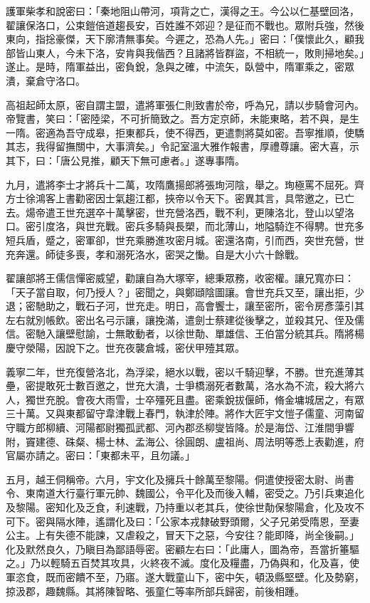 \begin{pinyinscope}
 護軍柴孝和說密曰：「秦地阻山帶河，項背之亡，漢得之王。今公以仁基壁回洛，翟讓保洛口，公束鎧倍道趨長安，百姓誰不郊迎？是征而不戰也。眾附兵強，然後東向，指捴豪傑，天下廓清無事矣。今遲之，恐為人先。」密曰：「僕懷此久，顧我部皆山東人，今未下洛，安肯與我偕西？且諸將皆群盜，不相統一，敗則掃地矣。」遂止。是時，隋軍益出，密負銳，急與之確，中流矢，臥營中，隋軍乘之，密眾潰，棄倉守洛口。



 高祖起師太原，密自謂主盟，遣將軍張仁則致書於帝，呼為兄，請以步騎會河內。帝覽書，笑曰：「密陸梁，不可折簡致之。吾方定京師，未能東略，若不與，是生一隋。密適為吾守成皋，拒東都兵，使不得西，更遣剽將莫如密。吾寧推順，使驕其志，我得留撫關中，大事濟矣。」令記室溫大雅作報書，厚禮尊讓。密大喜，示其下，曰：「唐公見推，顧天下無可慮者。」遂專事隋。



 九月，遣將李士才將兵十二萬，攻隋鷹揚郎將張珣河陰，舉之。珣極罵不屈死。齊方士徐鴻客上書勸密因士氣趨江都，挾帝以令天下。密異其言，具幣邀之，已亡去。煬帝遣王世充選卒十萬擊密，世充營洛西，戰不利，更陳洛北，登山以望洛口。密引度洛，與世充戰。密兵多騎與長槊，而北薄山，地隘騎迮不得騁。世充多短兵盾，蹙之，密軍卻，世充乘勝進攻密月城。密還洛南，引而西，突世充營，世充奔還。師徒多喪，孝和溺死洛水，密哭之慟。自是大小六十餘戰。



 翟讓部將王儒信憚密威望，勸讓自為大塚宰，總秉眾務，收密權。讓兄寬亦曰：「天子當自取，何乃授人？」密聞之，與鄭頲陰圖讓。會世充兵又至，讓出拒，少退；密馳助之，戰石子河，世充走。明日，高會饗士，讓至密所，密令房彥藻引其左右就別帳飲。密出名弓示讓，讓挽滿，遣劍士蔡建從後擊之，並殺其兄、侄及儒信。密馳入讓壁慰諭，士無敢動者，以徐世勣、單雄信、王伯當分統其兵。隋將楊慶守滎陽，因說下之。世充夜襲倉城，密伏甲殪其眾。



 義寧二年，世充復營洛北，為浮梁，絕水以戰，密以千騎迎擊，不勝。世充進薄其壘，密提敢死士數百邀之，世充大潰，士爭橋溺死者數萬，洛水為不流，殺大將六人，獨世充脫。會夜大雨雪，士卒殭死且盡。密乘銳拔偃師，脩金墉城居之，有眾三十萬。又與東都留守韋津戰上春門，執津於陣。將作大匠宇文愷子儒童、河南留守職方郎柳續、河陽都尉獨孤武都、河內郡丞柳燮皆降。於是海岱、江淮間爭響附，竇建德、硃粲、楊士林、孟海公、徐圓朗、盧祖尚、周法明等悉上表勸進，府官屬亦請之。密曰：「東都未平，且勿議。」



 五月，越王侗稱帝。六月，宇文化及擁兵十餘萬至黎陽。侗遣使授密太尉、尚書令、東南道大行臺行軍元帥、魏國公，令平化及而後入輔，密受之。乃引兵東追化及黎陽。密知化及乏食，利速戰，乃持重以老其兵，使徐世勣保黎陽倉，化及攻不可下。密與隔水陣，遙謂化及曰：「公家本戎隸破野頭爾，父子兄弟受隋恩，至妻公主。上有失德不能諫，又虐殺之，冒天下之惡，今安往？能即降，尚全後嗣。」化及默然良久，乃瞋目為鄙語辱密。密顧左右曰：「此庸人，圖為帝，吾當折箠驅之。」乃以輕騎五百焚其攻具，火終夜不滅。度化及糧盡，乃偽與和，化及喜，使軍恣食，既而密饋不至，乃寤。遂大戰童山下，密中矢，頓汲縣堅壁。化及勢窮，掠汲郡，趣魏縣。其將陳智略、張童仁等率所部兵歸密，前後相踵。




\end{pinyinscope}
